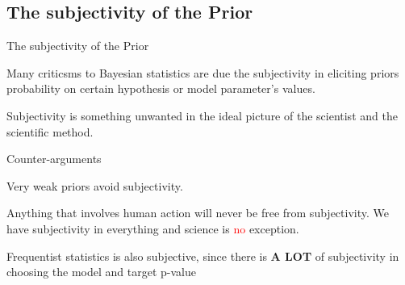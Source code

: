 \subsection{The subjectivity of the Prior}
\begin{frame}{The subjectivity of the Prior}
	\begin{vfilleditems}
		\item Many criticsms to Bayesian statistics are due the subjectivity
		in eliciting priors probability on certain hypothesis or model parameter's values.
		\item Subjectivity is something unwanted in the ideal picture of the
		scientist and the scientific method.
	\end{vfilleditems}
	Counter-arguments
	\begin{vfilleditems}
		\item Very weak priors avoid subjectivity.
		\item Anything that involves human action will never be free from
		subjectivity.
		We have subjectivity in everything and science is \textcolor{red}{no} exception.
		\item Frequentist statistics is also subjective, since there is \textbf{A LOT} of subjectivity in
		choosing the model and target p-value \parencite{jaynesProbabilityTheoryLogic2003, vandeschootBayesianStatisticsModelling2021}
	\end{vfilleditems}
\end{frame}


